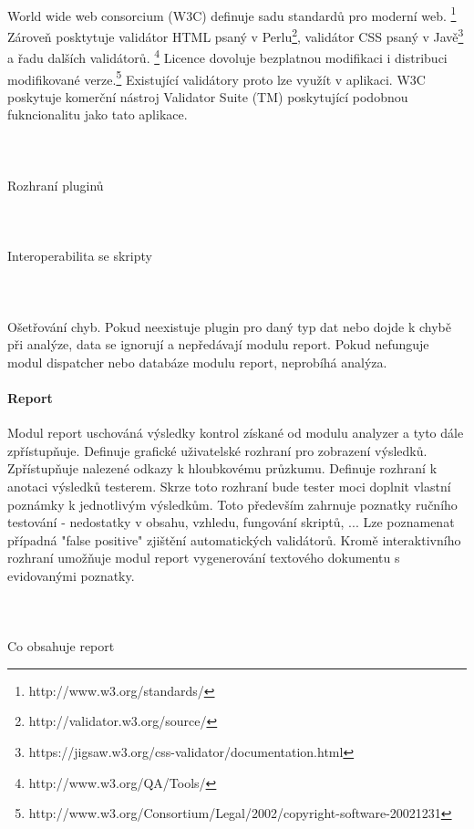 \documentclass[10pt]{article}
\begin{document}
\paragraph{~}World wide web consorcium (W3C)  definuje sadu standardů pro moderní web. \footnote{http://www.w3.org/standards/} Zároveň posktytuje validátor HTML psaný v Perlu\footnote{http://validator.w3.org/source/}, validátor CSS psaný v Javě\footnote{https://jigsaw.w3.org/css-validator/documentation.html} a řadu dalších validátorů. \footnote{http://www.w3.org/QA/Tools/} Licence dovoluje bezplatnou modifikaci i distribuci modifikované verze.\footnote{http://www.w3.org/Consortium/Legal/2002/copyright-software-20021231} Existující validátory proto lze využít v aplikaci. W3C poskytuje komerční nástroj Validator Suite (TM) poskytující podobnou fukncionalitu jako tato aplikace.
\paragraph{~}Rozhraní pluginů
\paragraph{~}Interoperabilita se skripty
\paragraph{~}Ošetřování chyb. Pokud neexistuje plugin pro daný typ dat nebo dojde k chybě při analýze, data se ignorují a nepředávají modulu report. Pokud nefunguje modul dispatcher nebo databáze modulu report, neprobíhá analýza.
\paragraph{Report} Modul report uschováná výsledky kontrol získané od modulu analyzer a tyto dále zpřístupňuje. Definuje grafické uživatelské rozhraní pro zobrazení výsledků. Zpřístupňuje nalezené odkazy k hloubkovému průzkumu. Definuje rozhraní k anotaci výsledků testerem. Skrze toto rozhraní bude tester moci doplnit vlastní poznámky k jednotlivým výsledkům. Toto především zahrnuje poznatky ručního testování - nedostatky v obsahu, vzhledu, fungování skriptů, ... Lze poznamenat případná "false positive" zjištění automatických validátorů. Kromě interaktivního rozhraní umožňuje modul report vygenerování textového dokumentu s evidovanými poznatky. 
\paragraph{~}Co obsahuje report
\end{document}
